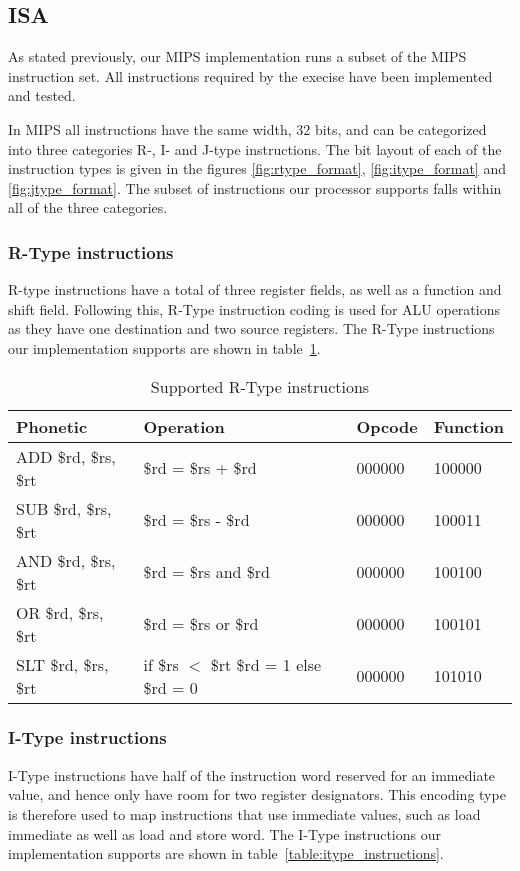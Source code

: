 \subsection{ISA}
\label{sec:isa}
As stated previously, our MIPS implementation runs a subset of the 
MIPS instruction set. All instructions required by the execise have 
been implemented and tested. 

In MIPS all instructions have the same width, 32 bits, and can be 
categorized into three categories R-, I- and J-type instructions. 
The bit layout of each of the instruction types is given in the 
figures \ref{fig:rtype_format}, \ref{fig:itype_format} and 
\ref{fig:jtype_format}. The subset of instructions our processor 
supports falls within all of the three categories. 

\FloatBarrier
\subsubsection{R-Type instructions}
R-type instructions have a total of three register fields, as well as 
a function and shift field. Following this, R-Type instruction coding 
is used for ALU operations as they have one destination and two source 
registers. The R-Type instructions our implementation supports are shown
in table~\ref{table:rtype_instructions}.


\begin{table}[h]
    \begin{tabular}{l|l|l|l}
    Phonetic & Operation & Opcode & Function \\

    \hline
    ADD \$rd, \$rs, \$rt & \$rd = \$rs + \$rd   & 000000 & 100000 \\
    SUB \$rd, \$rs, \$rt & \$rd = \$rs - \$rd   & 000000 & 100011 \\ 
    AND \$rd, \$rs, \$rt & \$rd = \$rs and \$rd & 000000 & 100100 \\ 
    OR  \$rd, \$rs, \$rt & \$rd = \$rs or \$rd  & 000000 & 100101 \\  
    SLT \$rd, \$rs, \$rt & if \$rs $<$ \$rt \$rd = 1 else \$rd = 0  & 000000 & 101010 \\
    \hline
    \end{tabular}

    \caption{Supported R-Type instructions}
    \label{table:rtype_instructions}
\end{table}

\FloatBarrier
\subsubsection{I-Type instructions}
I-Type instructions have half of the instruction word reserved for an 
immediate value, and hence only have room for two register designators. 
This encoding type is therefore used to map instructions that use immediate
values, such as load immediate as well as load and store word. 
The I-Type instructions our implementation supports are shown in 
table~\ref{table:itype_instructions}.


